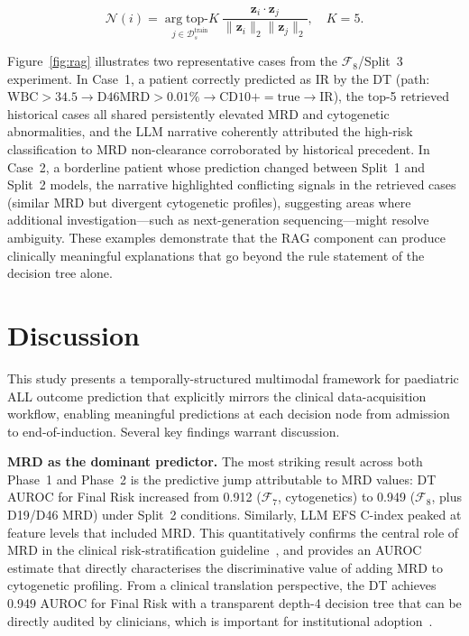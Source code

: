 \documentclass[pdflatex,sn-nature]{sn-jnl}
\begin{document}
\begin{equation}
\mathcal{N}(i) = \underset{j \in \mathcal{D}_s^{\text{train}}}
  {\arg\text{top-}K}\
  \frac{\mathbf{z}_i \cdot \mathbf{z}_j}
       {\|\mathbf{z}_i\|_2 \|\mathbf{z}_j\|_2},
\quad K = 5.
\label{eq:rag}
\end{equation}

Figure~\ref{fig:rag} illustrates two representative cases from the
$\mathcal{F}_8$/Split~3 experiment.
In Case~1, a patient correctly predicted as IR by the DT (path:
$\text{WBC} > 34.5 \rightarrow \text{D46MRD} > 0.01\% \rightarrow
\text{CD10+} = \text{true} \rightarrow \text{IR}$), the top-5
retrieved historical cases all shared persistently elevated MRD and
cytogenetic abnormalities, and the LLM narrative coherently attributed
the high-risk classification to MRD non-clearance corroborated by
historical precedent.
In Case~2, a borderline patient whose prediction changed between
Split~1 and Split~2 models, the narrative highlighted conflicting
signals in the retrieved cases (similar MRD but divergent cytogenetic
profiles), suggesting areas where additional investigation—such as
next-generation sequencing—might resolve ambiguity.
These examples demonstrate that the RAG component can produce
clinically meaningful explanations that go beyond the rule statement
of the decision tree alone.

\section{Discussion}\label{sec:discussion}

This study presents a temporally-structured multimodal framework for
paediatric ALL outcome prediction that explicitly mirrors the clinical
data-acquisition workflow, enabling meaningful predictions at each
decision node from admission to end-of-induction.
Several key findings warrant discussion.

\textbf{MRD as the dominant predictor.}
The most striking result across both Phase~1 and Phase~2 is the
predictive jump attributable to MRD values: DT AUROC for Final Risk
increased from 0.912 ($\mathcal{F}_7$, cytogenetics) to 0.949
($\mathcal{F}_8$, plus D19/D46 MRD) under Split~2 conditions.
Similarly, LLM EFS C-index peaked at feature levels that included
MRD.
This quantitatively confirms the central role of MRD in the
clinical risk-stratification guideline~\cite{[CITE:Conter2010]}, and
provides an AUROC estimate that directly characterises the
discriminative value of adding MRD to cytogenetic profiling.
From a clinical translation perspective, the DT achieves 0.949 AUROC
for Final Risk with a transparent depth-4 decision tree that can be
directly audited by clinicians, which is important for institutional
adoption~\cite{[CITE:Rudin2019]}.
\end{document}
